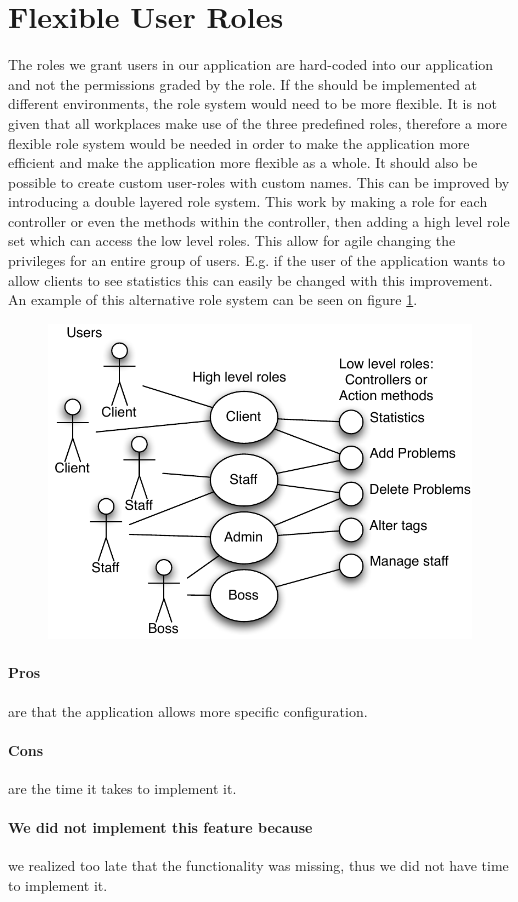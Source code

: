 \section{Flexible User Roles}
\label{sec:agile_roles}
The roles we grant users in our application are hard-coded into our application and not the permissions graded by the role.
If the \hdesk[] should be implemented at different environments, the role system would need to be more flexible. 
It is not given that all workplaces make use of the three predefined roles, therefore a more flexible role system would be needed in order to make the application more efficient and make the application more flexible as a whole.
It should also be possible to create custom user-roles with custom names.
This can be improved by introducing a double layered role system.  
This work by making a role for each controller or even the methods within the controller, then adding a high level role set which can access the low level roles. 
This allow for agile changing the privileges for an entire group of users. 
E.g. if the user of the application wants to allow clients to see statistics this can easily be changed with this improvement. An example of this alternative role system can be seen on figure \ref{fig:improved_role_system}.

\begin{figure}[h]
\begin{center}
\includegraphics[scale=0.7]{input/epilogue/improvements/improved_role_system.pdf}
\label{fig:improved_role_system}
\end{center}
\end{figure}

\paragraph{Pros} are that the application allows more specific configuration. 
\paragraph{Cons} are the time it takes to implement it.
\paragraph{We did not implement this feature because} we realized too late that the functionality was missing, thus we did not have time to implement it.


